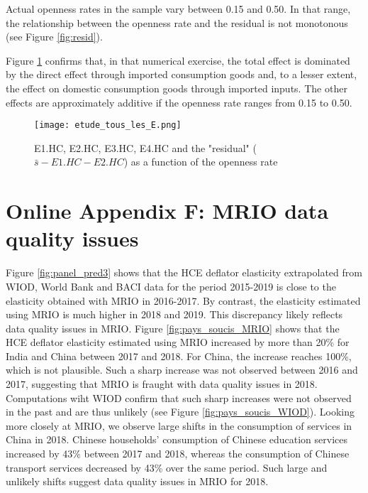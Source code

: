 \documentclass[12pt,a4paper]{article}
\begin{document}
Actual openness rates in the sample vary between 0.15 and 0.50. In that range, the relationship between the openness rate and the residual is not monotonous (see Figure \ref{fig:resid}).

Figure \ref{fig:tous_les_E} confirms that, in that numerical exercise, the total effect is dominated by the direct effect through imported consumption goods and, to a lesser extent, the effect on domestic consumption goods through imported inputs. 
The other effects are approximately additive if the openness rate ranges from 0.15 to 0.50.

\begin{figure}[H]
	\begin{center}
		\texttt{[image: etude\_tous\_les\_E.png]}
		\caption{E1.HC, E2.HC, E3.HC, E4.HC and the "residual"  ($\bar{s}-E1.HC-E2.HC$) as a function of the openness rate}
		\label{fig:tous_les_E}
	\end{center}
\end{figure}

\newpage
\section*{Online Appendix F: MRIO data quality issues}

Figure \ref{fig:panel_pred3} shows that the HCE deflator elasticity extrapolated from WIOD, World Bank and BACI data for the period 2015-2019 is close to the elasticity obtained with MRIO in 2016-2017. By contrast, the elasticity estimated using MRIO is much higher in 2018 and 2019. 
This discrepancy likely reflects data quality issues in MRIO.
Figure \ref{fig:pays_soucis_MRIO} shows that the HCE deflator elasticity estimated using MRIO increased by more than 20\% for India and China between 2017 and 2018.
For China, the increase reaches 100\%, which is not plausible.
Such a sharp increase was not observed between 2016 and 2017, suggesting that MRIO is fraught with data quality issues in 2018. 
Computations wiht WIOD confirm that such sharp increases were not observed in the past and are thus unlikely (see Figure \ref{fig:pays_soucis_WIOD}).
Looking more closely at MRIO, we observe large shifts in the consumption of services in China in 2018. 
Chinese households’ consumption of Chinese education services increased by 43\% between 2017 and 2018, whereas the consumption of Chinese transport services decreased by 43\% over the same period. 
Such large and unlikely shifts suggest data quality issues in MRIO for 2018. 
\end{document}
